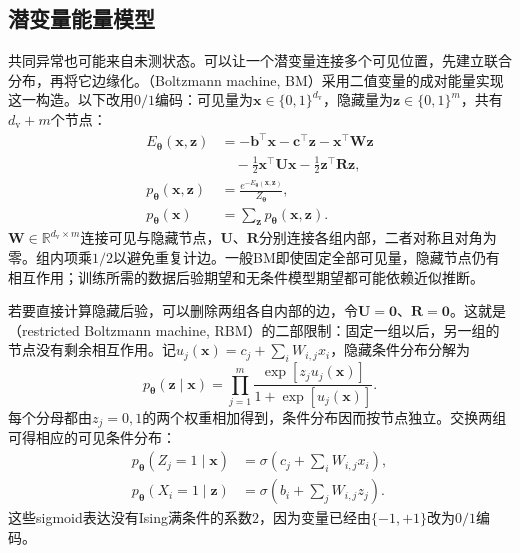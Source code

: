 \subsection{潜变量能量模型}
\label{sec:pgm-energy-models-latent}

共同异常也可能来自未测状态。可以让一个潜变量连接多个可见位置，先建立联合分布，再将它边缘化。（Boltzmann machine, BM）采用二值变量的成对能量实现这一构造。以下改用$0/1$编码：可见量为$\bm{x}\in\{0,1\}^{d_{\mathrm{v}}}$，隐藏量为$\bm{z}\in\{0,1\}^m$，共有$d_{\mathrm{v}}+m$个节点：
\begin{equation}
  \begin{aligned}
    E_{\bm{\theta}}(\bm{x},\bm{z})
      &=-\bm{b}^\top\bm{x}-\bm{c}^\top\bm{z}
        -\bm{x}^\top\bm{W}\bm{z}\\
      &\quad-\frac12\bm{x}^\top\bm{U}\bm{x}
             -\frac12\bm{z}^\top\bm{R}\bm{z},\\
    p_{\bm{\theta}}(\bm{x},\bm{z})
      &=\frac{e^{-E_{\bm{\theta}}(\bm{x},\bm{z})}}
               {Z_{\bm{\theta}}},\\
    p_{\bm{\theta}}(\bm{x})
      &=\sum_{\bm{z}}p_{\bm{\theta}}(\bm{x},\bm{z}).
  \end{aligned}
  \label{eq:pgm-energy-models-bm}
\end{equation}
$\bm{W}\in\mathbb{R}^{d_{\mathrm{v}}\times m}$连接可见与隐藏节点，$\bm{U}$、$\bm{R}$分别连接各组内部，二者对称且对角为零。组内项乘$1/2$以避免重复计边。一般BM即使固定全部可见量，隐藏节点仍有相互作用；训练所需的数据后验期望和无条件模型期望都可能依赖近似推断。

若要直接计算隐藏后验，可以删除两组各自内部的边，令$\bm{U}=\bm{0}$、$\bm{R}=\bm{0}$。这就是（restricted Boltzmann machine, RBM）的二部限制：固定一组以后，另一组的节点没有剩余相互作用。记$u_j(\bm{x})=c_j+\sum_iW_{i,j}x_i$，隐藏条件分布分解为
\[
  p_{\bm{\theta}}(\bm{z}\mid\bm{x})
   =\prod_{j=1}^m\frac{\exp[z_ju_j(\bm{x})]}
                         {1+\exp[u_j(\bm{x})]}.
\]
每个分母都由$z_j=0,1$的两个权重相加得到，条件分布因而按节点独立。交换两组可得相应的可见条件分布：
\begin{equation}
  \begin{aligned}
    p_{\bm{\theta}}(Z_j=1\mid\bm{x})
      &=\sigma\!\left(c_j+\sum_iW_{i,j}x_i\right),\\
    p_{\bm{\theta}}(X_i=1\mid\bm{z})
      &=\sigma\!\left(b_i+\sum_jW_{i,j}z_j\right).
  \end{aligned}
  \label{eq:pgm-energy-models-rbm-conditionals}
\end{equation}
这些sigmoid表达没有Ising满条件的系数$2$，因为变量已经由$\{-1,+1\}$改为$0/1$编码。

